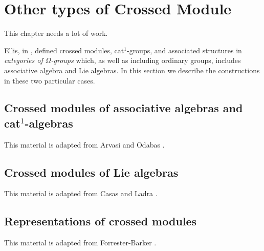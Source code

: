 
\section{Other types of Crossed Module}

This chapter needs a lot of work. 

\bigskip

Ellis, in \cite{ellis-thesis}, defined crossed modules, cat$^1$-groups, 
and associated structures in \emph{categories of $\Omega$-groups} which, 
as well as including ordinary groups, includes associative algebra 
and Lie algebras. 
In this section we describe the constructions in these two particular cases. 


\subsection{Crossed modules of associative algebras and cat$^1$-algebras}

This material is adapted from Arvasi and Odabas \cite{arv:oda}.









\subsection{Crossed modules of Lie algebras}

This material is adapted from Casas and Ladra \cite{casas:ladra}.




\subsection{Representations of crossed modules}

This material is adapted from Forrester-Barker \cite{f-b-thesis}.




